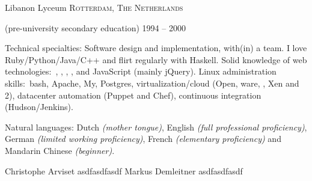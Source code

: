 \documentclass[10pt,a4paper]{article} %
\begin{document}

\headedsection %
{Libanon Lyceum}
{\textsc{Rotterdam, The Netherlands}} {

\headedsubsection %
{ \textnormal{(pre-university secondary education)}}
{1994 -- 2000} {}
}

\spacedhrule{0.5em}{-0.4em} %



\inlineheadsection %
{Technical specialties:}
{Software design and implementation, with(in) a team. I love Ruby/Python/Java/C++ and flirt regularly with Haskell. Solid knowledge of web technologies:\ , , , ,  and JavaScript (mainly jQuery). Linux administration skills:\ bash, Apache, My, Postgres, virtualization/cloud (Open, ware, , Xen and 2), datacenter automation (Puppet and Chef), continuous integration (Hudson/Jenkins).}


\inlineheadsection %
{Natural languages:}
{Dutch \textit{(mother tongue)}, English \textit{(full professional proficiency)}, German \textit{(limited working proficiency)}, French \textit{(elementary proficiency)} and Mandarin Chinese \textit{(beginner)}.}

\spacedhrule{1.6em}{-0.4em} %



  \inlineheadsection
      {Christophe Arviset}
      {asdfasdfasdf}
  \inlineheadsection
      {Markus Demleitner}
      {asdfasdfasdf}
\end{document}
